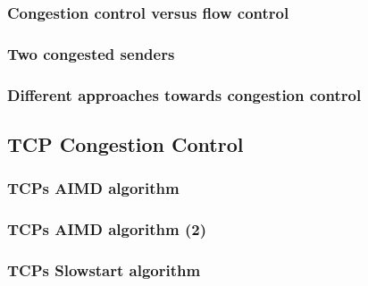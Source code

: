     \subsubsection*{Congestion control versus flow control}
    \subsubsection*{Two congested senders}
    \subsubsection*{Different approaches towards congestion control}

\subsection*{TCP Congestion Control}
    \subsubsection*{TCPs AIMD algorithm}
    \subsubsection*{TCPs AIMD algorithm (2)}
    \subsubsection*{TCPs Slowstart algorithm}